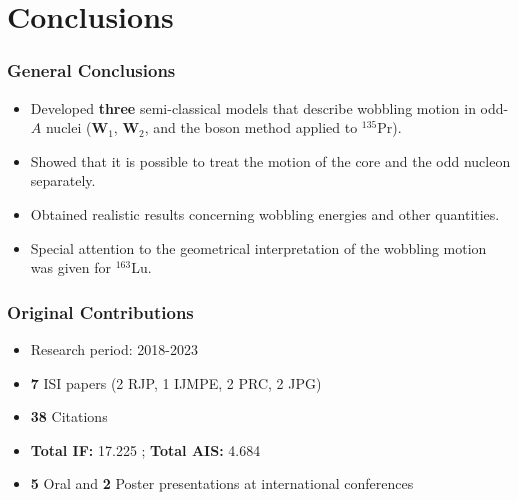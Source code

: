 \documentclass{beamer}
\begin{document}
\section{Conclusions}

\begin{frame}
	\frametitle{General Conclusions}
	\begin{itemize}
		\item Developed \textbf{three} semi-classical models that describe wobbling motion in odd-$A$ nuclei ($\mathbf{W}_1$, $\mathbf{W}_2$, and the boson method applied to $^{135}$Pr).
		\item Showed that it is possible to treat the motion of the core and the odd nucleon separately.
		\item Obtained realistic results concerning wobbling energies and other quantities.
		\item Special attention to the geometrical interpretation of the wobbling motion was given for $^{163}$Lu.
	\end{itemize}
\end{frame}


\begin{frame}
	\frametitle{Original Contributions}
	\begin{itemize}
		\item Research period: 2018-2023
		\item \textbf{7} ISI papers (2 RJP, 1 IJMPE, 2 PRC, 2 JPG)
		\item \textbf{38} Citations
		\item \textbf{Total IF:} 17.225 ; \textbf{Total AIS:} 4.684
		\item \textbf{5} Oral and \textbf{2} Poster presentations at international conferences
	\end{itemize}
\end{frame}

\end{document}
